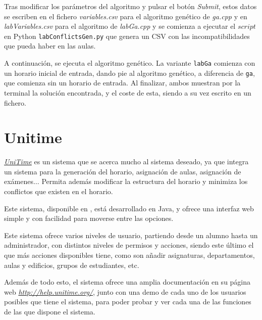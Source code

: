 Tras modificar los parámetros del algoritmo y pulsar el botón \textit{Submit}, estos datos se escriben en el fichero \textit{variables.csv} para el algoritmo genético de \textit{ga.cpp} y en \textit{labVariables.csv} para el algoritmo de \textit{labGa.cpp} y se comienza a ejecutar el $script$ en Python \texttt{labConflictsGen.py} que genera un CSV con las incompatibilidades que pueda haber en las aulas.

A continuación, se ejecuta el algoritmo genético. La variante \texttt{labGa} comienza con un horario inicial de entrada, dando pie al algoritmo genético, a diferencia de \texttt{ga}, que comienza sin un horario de entrada. Al finalizar, ambos muestran por la terminal la solución encontrada, y el coste de esta, siendo a su vez escrito en un fichero.

\section{Unitime}

\href{https://github.com/UniTime/unitime}{\textit{UniTime}} es un sistema que se acerca mucho al sistema deseado, ya que integra un sistema para la generación del horario, asignación de aulas, asignación de exámenes$\ldots$ Permita además modificar la estructura del horario y minimiza los conflictos que existen en el horario.

Este sistema, disponible en \cite{unitime}, está desarrollado en Java, y ofrece una interfaz web simple y con facilidad para moverse entre las opciones.

Este sistema ofrece varios niveles de usuario, partiendo desde un alumno hasta un administrador, con distintos niveles de permisos y acciones, siendo este último el que más acciones disponibles tiene, como son añadir asignaturas, departamentos, aulas y edificios, grupos de estudiantes, etc. 

Además de todo esto, el sistema ofrece una amplia documentación en su página web \href{http://help.unitime.org/}{\textit{http://help.unitime.org/}}, junto con una demo de cada uno de los usuarios posibles que tiene el sistema, para poder probar y ver cada una de las funciones de las que dispone el sistema.

